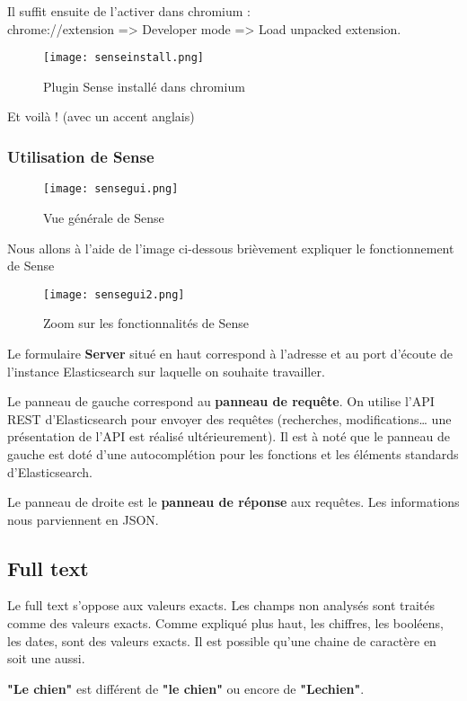 Il suffit ensuite de l'activer dans chromium :\\ 
chrome://extension => Developer mode => Load unpacked extension.
\begin{figure}[H]
\center
\texttt{[image: senseinstall.png]}
\label{fig:senseinstall}
\caption{Plugin Sense installé dans chromium}
\end{figure}
Et voilà ! \footnotesize{(avec un accent anglais)}
\subsubsection{Utilisation de Sense}

\begin{figure}[H]
\center
\texttt{[image: sensegui.png]}
\label{fig:sensegui}
\caption{Vue générale de Sense}
\end{figure}

Nous allons à l'aide de l'image ci-dessous brièvement expliquer le fonctionnement de Sense
\begin{figure}[H]
\center
\texttt{[image: sensegui2.png]}
\label{fig:sensegui2.png}
\caption{Zoom sur les fonctionnalités de Sense}
\end{figure}
Le formulaire \textbf{Server} situé en haut correspond à l'adresse et au port d'écoute 
de l'instance Elasticsearch sur laquelle on souhaite travailler.

Le panneau de gauche correspond au \textbf{panneau de requête}. On utilise l'API 
REST d'Elasticsearch pour envoyer des requêtes (recherches, modifications\ldots 
une présentation de l'API est réalisé ultérieurement). Il est à noté que le panneau 
de gauche est doté d'une autocomplétion pour les fonctions et les éléments standards 
d'Elasticsearch.

Le panneau de droite est le \textbf{panneau de réponse} aux requêtes. Les informations
nous parviennent en JSON.

\subsection{Full text}
\label{subsec:elasticfulltext}
Le full text s'oppose aux valeurs exacts.
Les champs non analysés sont traités comme des valeurs exacts.
Comme expliqué plus haut, les chiffres, les booléens, les dates, sont des valeurs 
exacts. Il est possible qu'une chaine de caractère en soit une aussi.

\textbf{"Le chien"} est différent de \textbf{"le chien"} ou encore de \textbf{"Lechien"}.

